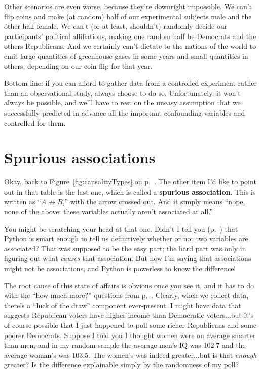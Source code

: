 Other scenarios are even worse, because they're downright impossible. We can't
flip coins and make (at random) half of our experimental subjects male
and the other half female. We can't (or at least, shouldn't) randomly decide
our participants' political affiliations, making one random half be Democrats
and the others Republicans. And we certainly can't dictate to the nations of
the world to emit large quantities of greenhouse gases in some years and small
quantities in others, depending on our coin flip for that year.

Bottom line: if you can afford to gather data from a controlled experiment
rather than an observational study, always choose to do so. Unfortunately, it
won't always be possible, and we'll have to rest on the uneasy assumption that
we successfully predicted in advance all the important confounding variables
and controlled for them.

\section{Spurious associations}


Okay, back to Figure~\ref{fig:causalityTypes} on
p.~\pageref{fig:causalityTypes}. The other item I'd like to point out in that
table is the last one, which is called a \textbf{spurious association}. This is
written as ``$A \not\rightarrow B$,'' with the arrow crossed out. And it simply
means ``nope, none of the above: these variables actually aren't associated at
all.''

You might be scratching your head at that one. Didn't I tell you
(p.~\pageref{pythonAssociation}) that Python is smart enough to tell us
definitively whether or not two variables are associated? That was supposed to
be the easy part; the hard part was only in figuring out what \textit{causes}
that association. But now I'm saying that associations might not be
associations, and Python is powerless to know the difference!

The root cause of this state of affairs is obvious once you see it, and it has
to do with the ``how much more?'' questions from p.~\pageref{howMuchMore}.
Clearly, when we collect data, there's a ``luck of the draw'' component
ever-present. I might have data that suggests Republican voters have higher
income than Democratic voters...but it's of course possible that I just
happened to poll some richer Republicans and some poorer Democrats. Suppose I
told you I thought women were on average smarter than men, and in my random
sample the average men's IQ was 102.7 and the average woman's was 103.5. The
women's was indeed greater...but is that \textit{enough} greater? Is the
difference explainable simply by the randomness of my poll?

